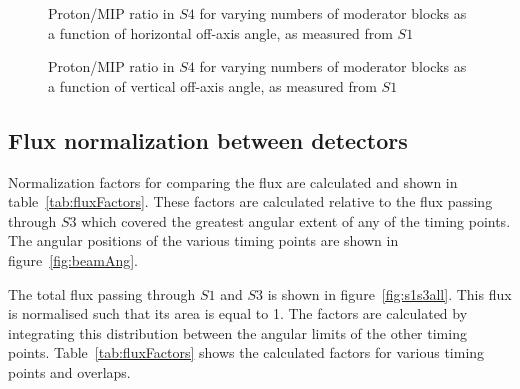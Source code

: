    	\begin{figure}[ht]
   		\begin{minipage}[t]{0.48\textwidth}
   			\begin{adjustbox}{max totalsize={\textwidth}{.35\textheight}, center}
   				
   			\end{adjustbox}
   			\caption{Proton/MIP ratio in $S4$ for varying numbers of moderator blocks as a function of horizontal off-axis angle, as measured from $S1$}
   			\label{fig:propiratio_s4_horz}
   		\end{minipage}
   		\hspace{0.3cm}
    	\begin{minipage}[t]{0.48\textwidth}
    		\begin{adjustbox}{max totalsize={\textwidth}{.35\textheight}, center}
	    		
	    	\end{adjustbox}
    		\caption{Proton/MIP ratio in $S4$ for varying numbers of moderator blocks as a function of vertical off-axis angle, as measured from $S1$}
    		\label{fig:propiratio_s4_vert}
    	\end{minipage}	
   	\end{figure}
   
	\subsection{Flux normalization between detectors}
	
	Normalization factors for comparing the flux are calculated and shown in table~\ref{tab:fluxFactors}.
	These factors are calculated relative to the flux passing through $S3$ which covered the greatest angular extent of any of the timing points. 
	The angular positions of the various timing points are shown in figure~\ref{fig:beamAng}.
	
	\begin{figure}[h]
		
	\end{figure}
		
	The total flux passing through $S1$ and $S3$ is shown in figure~\ref{fig:s1s3all}.
	This flux is normalised such that its area is equal to 1.
	The factors are calculated by integrating this distribution between the angular limits of the other timing points.
	Table~\ref{tab:fluxFactors} shows the calculated factors for various timing points and overlaps.
	
